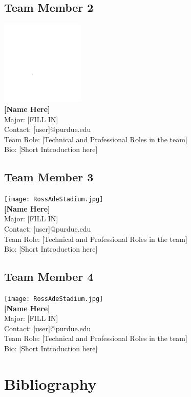 \documentclass[letterpaper, 11pt]{article}
\begin{document}
\subsection{Team Member 2}
\includegraphics[height=4cm]{white.png} \\
\textbf{[Name Here]}\\
Major: [FILL IN]\\
Contact: [user]@purdue.edu\\
Team Role: [Technical and Professional Roles in the team] \\
Bio: [Short Introduction here]

\subsection{Team Member 3}
\texttt{[image: RossAdeStadium.jpg]} \\
\textbf{[Name Here]}\\
Major: [FILL IN]\\
Contact: [user]@purdue.edu\\
Team Role: [Technical and Professional Roles in the team] \\
Bio: [Short Introduction here]

\subsection{Team Member 4}
\texttt{[image: RossAdeStadium.jpg]} \\
\textbf{[Name Here]}\\
Major: [FILL IN]\\
Contact: [user]@purdue.edu\\
Team Role: [Technical and Professional Roles in the team] \\
Bio: [Short Introduction here]

\clearpage
\section{Bibliography}
\end{document}

